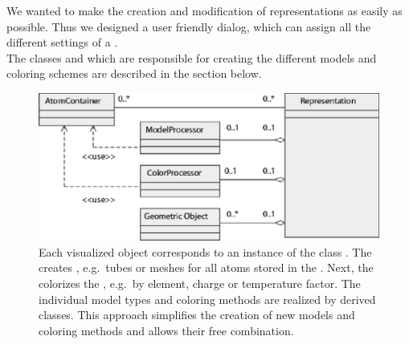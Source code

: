 We wanted to make the creation and modification of representations as easily as possible.
Thus we designed a user friendly dialog, which can assign all
the different settings of a .\\
The classes  and  which are responsible 
for creating the different models and coloring schemes are described in the
section below.
\begin{figure}[ht] %
\centering
\includegraphics[width=1.\textwidth]{representation.eps}
\caption[UML diagram for the  class]
{Each visualized object corresponds to an instance of the class .
The  creates , e.g.\ tubes or meshes for all atoms stored in the .
Next, the  colorizes the , e.g.\ by element, 
charge or temperature factor.
The individual model types and coloring methods are realized by derived classes.
This approach simplifies the creation of new models and coloring methods and allows their 
free combination.}
\label{fig:representation}
\end{figure}

